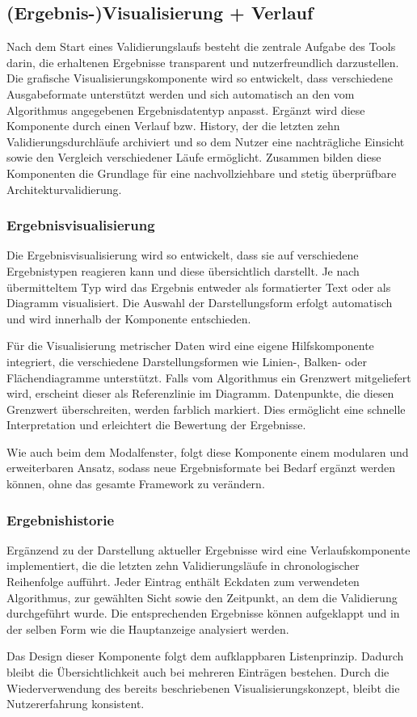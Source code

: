 \subsection{(Ergebnis-)Visualisierung + Verlauf}
\label{subsec:visualisierung}

Nach dem Start eines Validierungslaufs besteht die zentrale Aufgabe des Tools darin, die erhaltenen Ergebnisse transparent und nutzerfreundlich darzustellen. Die grafische Visualisierungskomponente wird so entwickelt, dass verschiedene Ausgabeformate unterstützt werden und sich automatisch an den vom Algorithmus angegebenen Ergebnisdatentyp anpasst. Ergänzt wird diese Komponente durch einen Verlauf bzw. History, der die letzten zehn Validierungsdurchläufe archiviert und so dem Nutzer eine nachträgliche Einsicht sowie den Vergleich verschiedener Läufe ermöglicht. Zusammen bilden diese Komponenten die Grundlage für eine nachvollziehbare und stetig überprüfbare Architekturvalidierung.

\subsubsection*{Ergebnisvisualisierung}
\label{subsubsec:ergebnisvis}

Die Ergebnisvisualisierung wird so entwickelt, dass sie auf verschiedene Ergebnistypen reagieren kann und diese übersichtlich darstellt. Je nach übermitteltem Typ wird das Ergebnis entweder als formatierter Text oder als Diagramm visualisiert. Die Auswahl der Darstellungsform erfolgt automatisch und wird innerhalb der Komponente entschieden.

Für die Visualisierung metrischer Daten wird eine eigene Hilfskomponente integriert, die verschiedene Darstellungsformen wie Linien-, Balken- oder Flächendiagramme unterstützt. Falls vom Algorithmus ein Grenzwert mitgeliefert wird, erscheint dieser als Referenzlinie im Diagramm. Datenpunkte, die diesen Grenzwert überschreiten, werden farblich markiert. Dies ermöglicht eine schnelle Interpretation und erleichtert die Bewertung der Ergebnisse.

Wie auch beim dem Modalfenster, folgt diese Komponente einem modularen und erweiterbaren Ansatz, sodass neue Ergebnisformate bei Bedarf ergänzt werden können, ohne das gesamte Framework zu verändern.

\subsubsection*{Ergebnishistorie}
\label{subsubsec:ergebnisverlauf}


Ergänzend zu der Darstellung aktueller Ergebnisse wird eine Verlaufskomponente implementiert, die die letzten zehn Validierungsläufe in chronologischer Reihenfolge aufführt. Jeder Eintrag enthält Eckdaten zum verwendeten Algorithmus, zur gewählten Sicht sowie den Zeitpunkt, an dem die Validierung durchgeführt wurde. Die entsprechenden Ergebnisse können aufgeklappt und in der selben Form wie die Hauptanzeige analysiert werden.

Das Design dieser Komponente folgt dem aufklappbaren Listenprinzip. Dadurch bleibt die Übersichtlichkeit auch bei mehreren Einträgen bestehen. Durch die Wiederverwendung des bereits beschriebenen Visualisierungskonzept, bleibt die Nutzererfahrung konsistent.

